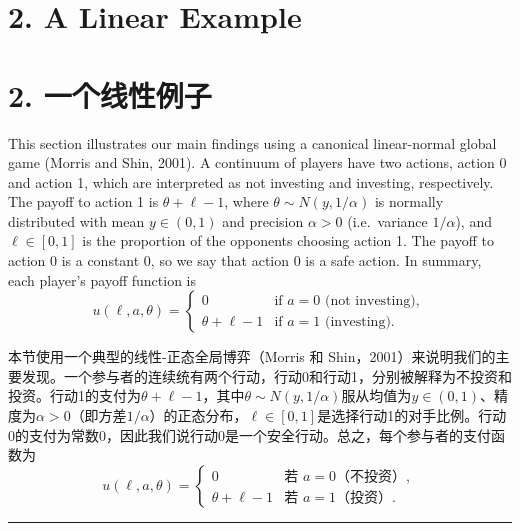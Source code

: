 \documentclass[12pt,a4paper]{article}
\newenvironment{original}
  {\par\medskip\noindent\color{black}\ignorespaces}
  {\par\medskip}
\newenvironment{translation}
  {\par\noindent\color{darkblue}\ignorespaces}
  {\par\medskip\noindent\hrule\par\medskip}
\theoremstyle{definition}
\theoremstyle{remark}
\begin{document}
\section{2. A Linear Example}
\section*{\color{darkblue}2. 一个线性例子}

\begin{original}
This section illustrates our main findings using a canonical linear-normal global game (Morris and Shin, 2001). A continuum of players have two actions, action 0 and action 1, which are interpreted as not investing and investing, respectively. The payoff to action 1 is $\theta + \ell - 1$, where $\theta \sim N(y, 1/\alpha)$ is normally distributed with mean $y \in (0, 1)$ and precision $\alpha > 0$ (i.e.\ variance $1/\alpha$), and $\ell \in [0, 1]$ is the proportion of the opponents choosing action 1. The payoff to action 0 is a constant 0, so we say that action 0 is a safe action. In summary, each player's payoff function is
\[
u(\ell, a, \theta) =
\begin{cases}
0 & \text{if } a = 0 \text{ (not investing)},\\
\theta + \ell - 1 & \text{if } a = 1 \text{ (investing)}.
\end{cases}
\]
\end{original}
\begin{translation}
本节使用一个典型的线性-正态全局博弈（Morris 和 Shin，2001）来说明我们的主要发现。一个参与者的连续统有两个行动，行动0和行动1，分别被解释为不投资和投资。行动1的支付为$\theta + \ell - 1$，其中$\theta \sim N(y, 1/\alpha)$服从均值为$y \in (0, 1)$、精度为$\alpha > 0$（即方差$1/\alpha$）的正态分布，$\ell \in [0, 1]$是选择行动1的对手比例。行动0的支付为常数0，因此我们说行动0是一个安全行动。总之，每个参与者的支付函数为
\[
u(\ell, a, \theta) =
\begin{cases}
0 & \text{若 } a = 0 \text{（不投资）},\\
\theta + \ell - 1 & \text{若 } a = 1 \text{（投资）}.
\end{cases}
\]
\end{translation}
\end{document}
